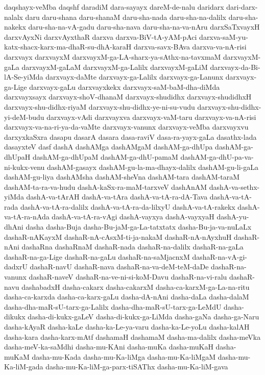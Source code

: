 {daqshayx-veMba
daqshf
daradiM
dara-sayayx
dareM-de-nalu
daridarx
dari-darx-nalalx
daru
daru-shana
daru-shanaM
daru-sha-nada
daru-sha-na-dalilx
daru-sha-nakekx
daru-sha-na-vA-gadu
daru-sha-nava
daru-sha-na-va-nAru
darxSaTxvayxH
darxvAyxNi
darxvAyxthaR
darxva
darxva-BiV-tA-yAM-pAci
darxva-saM-yu-katx-shacx-karx-ma-dhaR-su-dhA-karaH
darxva-savx-BAva
darxva-va-nA-risi
darxvayx
darxvayxM
darxvayxM-ga-LA-sharx-ya-sAthx-na-tavxmaM
darxvayxM-gaLa
darxvayxM-gaLaM
darxvayxM-ga-Lalilx
darxvayxM-gaLiM
darxvayx-da-Bi-lA-Se-yiMda
darxvayx-daMte
darxvayx-ga-Lalilx
darxvayx-ga-Lanunx
darxvayx-ga-Lige
darxvayx-gaLu
darxvayxkekx
darxvayx-saM-baM-dha-diMda
darxvayxsayx
darxvayx-shoV-dhanaM
darxvayx-shudidhx
darxvayx-shudidhxH
darxvayx-shu-didhx-riyaM
darxvayx-shu-didhx-ye-ni-su-vudu
darxvayx-shu-didhx-yi-deM-budu
darxvayx-vAdi
darxvayxva
darxvayx-vaM-taru
darxvayx-va-nA-risi
darxvayx-va-na-ri-ya-da-vaMte
darxvayx-vanunx
darxvayx-veMba
darxvayxvu
darxyxkaSxra
dasapu
dasarA
dasara
dasa-raviV
dasa-ra-yayx-gaLa
dasathx-lada
dasayxteV
dasf
dashA
dashAMga
dashAMgaM
dashAM-ga-dhUpa
dashAM-ga-dhUpaH
dashAM-ga-dhUpaM
dashAM-ga-dhU-pamaM
dashAM-ga-dhU-pa-va-ni-kukx-venu
dashAM-gasayx
dashAM-gu-la-ma-dhayx-dalilx
dashAM-gu-li-gaLa
dashAM-gu-liya
dashAMsha
dashAM-sheVna
dashAM-tara
dashAM-taraM
dashAM-ta-ra-va-hudu
dashA-kaSx-ra-maM-tarxveV
dashAnAM
dashA-va-sethx-yiMda
dashA-va-tArAH
dashA-va-tAra
dashA-va-tA-ra-dA-Tava
dashA-va-tA-rada
dashA-va-tA-ra-dalilx
dashA-va-tA-ra-da-lilxyU
dashA-va-tA-rakekx
dashA-va-tA-ra-nAda
dashA-va-tA-ra-vAgi
dashA-vayxya
dashA-vayxyaH
dashA-yu-dhAni
dasha
dasha-Buja
dasha-Bu-jaM-ga-La-tatxtatx
dasha-Bu-ja-va-nuLaLx
dashaR-nAKayxM
dashaR-nA-cAsxM-ti-ja-nakaM
dashaR-nA-nAyxhuH
dashaR-nAni
dashaRna
dashaRnaM
dashaR-nada
dashaR-na-dalilx
dashaR-na-gaLa
dashaR-na-ga-Lige
dashaR-na-gaLu
dashaR-na-saMjacnxM
dashaR-na-vA-gi-dadxrU
dashaR-navU
dashaR-nava
dashaR-na-va-deM-teM-daDe
dashaR-na-vanunx
dashaR-naveV
dashaR-na-ve-ni-si-koM-Davu
dashaR-na-vi-ralu
dashaR-navu
dashabadxH
dasha-cakarx
dasha-cakarxM
dasha-ca-karxM-ga-La-na-ritu
dasha-ca-karxda
dasha-ca-karx-gaLu
dasha-dA-nAni
dasha-daLa
dasha-dalaM
dasha-dha-maR-sU-tarx-ga-Lalilx
dasha-dha-maR-sU-tarx-ga-LeMdU
dasha-dikukx
dasha-di-kukx-gaLeV
dasha-di-kukx-ga-LiMda
dasha-gaNa
dasha-ga-Naru
dasha-kAyaR
dasha-kaLe
dasha-ka-Le-ya-varu
dasha-ka-Le-yoLu
dasha-kalAH
dasha-kara
dasha-karx-mAtf
dashamaH
dashamaM
dasha-ma-dalilx
dasha-meVka
dasha-meV-ka-saMdhi
dasha-mu-KAni
dasha-muKa
dasha-muKaH
dasha-muKaM
dasha-mu-Kada
dasha-mu-Ka-liMga
dasha-mu-Ka-liMgaM
dasha-mu-Ka-liM-gada
dasha-mu-Ka-liM-ga-parx-tiSAThx
dasha-mu-Ka-liM-gava
}
